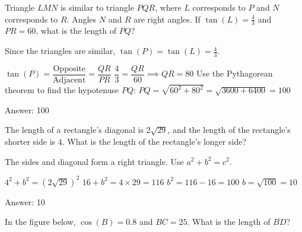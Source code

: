 \documentclass[11pt,paper=a4,answers]{exam}
\begin{document}
\begin{questions}
\vspace{1cm}

\question
Triangle $LMN$ is similar to triangle $PQR$, where $L$ corresponds to $P$ and $N$ corresponds to $R$. Angles $N$ and $R$ are right angles. If $\tan(L) = \frac{4}{3}$ and $PR = 60$, what is the length of $\overline{PQ}$?

\begin{solution}
Since the triangles are similar, $\tan(P) = \tan(L) = \frac{4}{3}$.
\vspace{5pt}
\begin{center}
$\tan(P) = \dfrac{\text{Opposite}}{\text{Adjacent}} = \dfrac{QR}{PR}$
\vspace{5pt}
$\dfrac{4}{3} = \dfrac{QR}{60} \implies QR = 80$
\vspace{10pt}
Use the Pythagorean theorem to find the hypotenuse $PQ$:
\vspace{5pt}
$PQ = \sqrt{60^2 + 80^2} = \sqrt{3600 + 6400} = 100$
\end{center}
\vspace{5pt}
Answer: \colorbox{yellow!100}{100}
\end{solution}

\vspace{1cm}

\question
The length of a rectangle's diagonal is $2\sqrt{29}$, and the length of the rectangle's shorter side is $4$. What is the length of the rectangle's longer side?

\begin{solution}
The sides and diagonal form a right triangle. Use $a^2 + b^2 = c^2$.
\vspace{5pt}
\begin{center}
$4^2 + b^2 = (2\sqrt{29})^2$
\vspace{5pt}
$16 + b^2 = 4 \times 29 = 116$
\vspace{5pt}
$b^2 = 116 - 16 = 100$
\vspace{5pt}
$b = \sqrt{100} = 10$
\end{center}
\vspace{5pt}
Answer: \colorbox{yellow!100}{10}
\end{solution}

\vspace{1cm}

\question
In the figure below, $\cos(B) = 0.8$ and $BC = 25$. What is the length of $\overline{BD}$?
\begin{center}
\end{center}


\end{questions}
\end{document}
